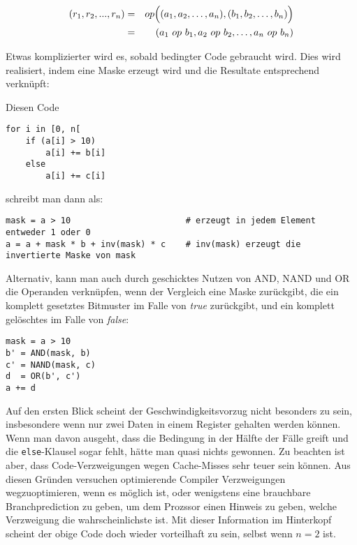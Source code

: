 \documentclass[a4paper,10pt]{article}
\begin{document}
\begin{eqnarray*}
    (r_1, r_2, ..., r_n)    & = & op\Bigl( (a_1, a_2, \dots, a_n), (b_1, b_2, \dots, b_n) \Bigr)\\ 
                            & = & (a_1 \ op \ b_1, a_2 \ op \ b_2, \dots, a_n \ op \ b_n)
\end{eqnarray*}

Etwas komplizierter wird es, sobald bedingter Code gebraucht wird. Dies wird realisiert, indem eine
Maske erzeugt wird und die Resultate entsprechend verknüpft:

Diesen Code

\begin{verbatim}
for i in [0, n[
    if (a[i] > 10)
        a[i] += b[i]
    else
        a[i] += c[i]
\end{verbatim}
    
schreibt man dann als:

\begin{verbatim}
mask = a > 10                       # erzeugt in jedem Element entweder 1 oder 0
a = a + mask * b + inv(mask) * c    # inv(mask) erzeugt die invertierte Maske von mask
\end{verbatim}

Alternativ, kann man auch durch geschicktes Nutzen von AND, NAND und OR die Operanden
verknüpfen, wenn der Vergleich eine Maske zurückgibt, die ein komplett gesetztes Bitmuster
im Falle von \emph{true} zurückgibt, und ein komplett gelöschtes im Falle von \emph{false}:

\begin{verbatim}
mask = a > 10
b' = AND(mask, b)
c' = NAND(mask, c)
d  = OR(b', c')
a += d
\end{verbatim}

Auf den ersten Blick scheint der Geschwindigkeitsvorzug nicht besonders zu sein, insbesondere wenn
nur zwei Daten in einem Register gehalten werden können. Wenn man davon ausgeht, dass die Bedingung
in der Hälfte der Fälle greift und die \texttt{else}-Klausel sogar fehlt, hätte man quasi nichts
gewonnen. Zu beachten ist aber, dass Code-Verzweigungen wegen Cache-Misses sehr teuer sein können.
Aus diesen Gründen versuchen optimierende Compiler Verzweigungen wegzuoptimieren, wenn es möglich
ist, oder wenigstens eine brauchbare Branchprediction zu geben, um dem Prozssor einen Hinweis zu
geben, welche Verzweigung die wahrscheinlichste ist. Mit dieser Information im Hinterkopf scheint
der obige Code doch wieder vorteilhaft zu sein, selbst wenn $n = 2$ ist.
\end{document}

